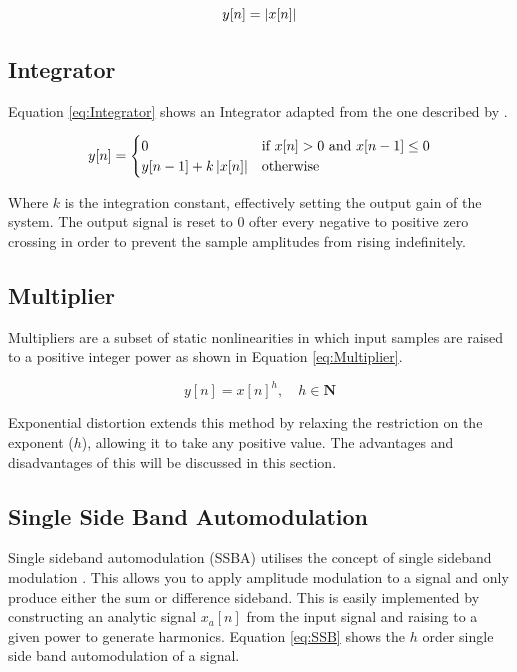 		\begin{equation}
			y[n] = \left|x[n]\right|
			\label{eq:FullWaveRectification}
		\end{equation}

	\subsection{Integrator}
	\label{sec:Excitation-Methods-Integrator}
		Equation \ref{eq:Integrator} shows an Integrator adapted from the one described by \citet{larsen2004audio}.

		\begin{equation}
			y[n] = \begin{cases}
				0 & \text{if $x[n] > 0$ and $x[n - 1] \leq 0$} \\
				y[n - 1] + k\left|x[n]\right| & \text{otherwise}
			\end{cases}
			\label{eq:Integrator}
		\end{equation}

		Where $k$ is the integration constant, effectively setting the output gain of the system. The output signal
		is reset to 0 ofter every negative to positive zero crossing in order to prevent the sample amplitudes from
		rising indefinitely.

	\subsection{Multiplier}
	\label{sec:Excitation-Methods-Multiplier}
		Multipliers are a subset of static nonlinearities in which input samples are raised to a positive integer
		power as shown in Equation \ref{eq:Multiplier}.

		\begin{equation}
			y[n] = x[n]^{h}, \quad h \in \textbf{N}
			\label{eq:Multiplier}
		\end{equation}

		Exponential distortion extends this method by relaxing the restriction on the exponent ($h$), allowing it
		to take any positive value. The advantages and disadvantages of this will be discussed in this section.

	\subsection{Single Side Band Automodulation}
	\label{sec:Excitation-Methods-SSBA}
		Single sideband automodulation (SSBA) utilises the concept of single sideband modulation
		\citep{corinthios2009signals}. This allows you to apply amplitude modulation to a signal and only produce
		either the sum or difference sideband. This is easily implemented by constructing an analytic signal
		$x_{a}[n]$ from the input signal and raising to a given power to generate harmonics. Equation \ref{eq:SSB}
		shows the $h$ order single side band automodulation of a signal.

